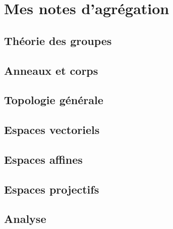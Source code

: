 



\makeindex
\makenomenclature





    

\tableofcontents



\part{Mes notes d'agrégation}

\chapter{Théorie des groupes}


\chapter{Anneaux et corps}


\chapter{Topologie générale}


\chapter{Espaces vectoriels}


\chapter{Espaces affines}


\chapter{Espaces projectifs}


\chapter{Analyse}






